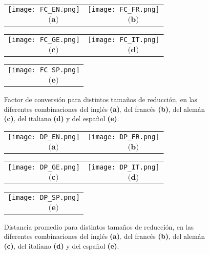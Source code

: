 \begin{figure}[h!] 
	\centering
	\begin{tabular}{cc}
		\texttt{[image: FC\_EN.png]} &
		\texttt{[image: FC\_FR.png]} \\
		$\,\,\,\,\,\,\,\,\,\,\,\,\,\,\, \textbf{(a)}$      & 
		$\,\,\,\,\,\,\,\,\,\,\,\,\,\,\, \textbf{(b)}$     \\
	\end{tabular}
	
	\begin{tabular}{cc}
		\texttt{[image: FC\_GE.png]} &
		\texttt{[image: FC\_IT.png]} \\
		$\,\,\,\,\,\,\,\,\,\,\,\,\,\,\, \textbf{(c)}$      & $\,\,\,\,\,\,\,\,\,\,\,\,\,\,\, \textbf{(d)}$     \\
	\end{tabular}
	\begin{tabular}{c}
		\texttt{[image: FC\_SP.png]} \\
		$\,\,\,\,\,\,\,\,\,\,\,\,\,\,\, \textbf{(e)}$     \\
	\end{tabular}
	\caption{Factor de conversión para distintos tamaños de reducción, en las diferentes combinaciones del inglés \textbf{(a)}, del francés \textbf{(b)}, del alemán \textbf{(c)}, del italiano \textbf{(d)} y del español \textbf{(e)}.}
	\label{fig.FC_eliminacion}
\end{figure} 


\begin{figure}[t]
	\centering
	\begin{tabular}{cc}
		\texttt{[image: DP\_EN.png]} &
		\texttt{[image: DP\_FR.png]} \\
		$\,\,\,\,\,\,\,\,\,\,\,\,\,\,\, \textbf{(a)}$    & 
		$\,\,\,\,\,\,\,\,\,\,\,\,\,\,\, \textbf{(b)}$ \\
	\end{tabular}
	
	\begin{tabular}{cc}
		\texttt{[image: DP\_GE.png]} &
		\texttt{[image: DP\_IT.png]} \\
		$\,\,\,\,\,\,\,\,\,\,\,\,\,\,\, \textbf{(c)}$    & 
		$\,\,\,\,\,\,\,\,\,\,\,\,\,\,\, \textbf{(d)}$    \\
	\end{tabular}
	\begin{tabular}{c}
		\texttt{[image: DP\_SP.png]} \\
		$\,\,\,\,\,\,\,\,\,\,\,\,\,\,\, \textbf{(e)}$  \\
	\end{tabular}
	\caption{Distancia promedio para distintos tamaños de reducción, en las diferentes combinaciones del inglés \textbf{(a)}, del francés \textbf{(b)}, del alemán \textbf{(c)}, del italiano \textbf{(d)} y del español \textbf{(e)}.}
	\label{fig.DP_eliminacion}
\end{figure} 


